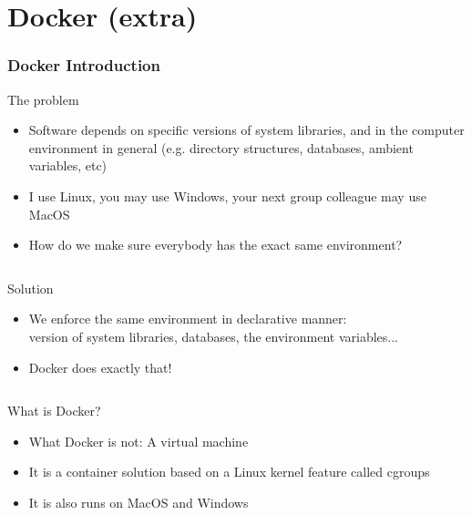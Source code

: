 \documentclass[fleqn,aspectratio=169,10pt]{beamer}
\begin{document}
\section{Docker (extra)}
\begin{frame}
  \frametitle{Docker Introduction}
  \vspace*{-1.5ex}
  \pause
  \begin{block}{The problem}
    \begin{itemize}
      \item Software depends on specific versions of system libraries, and in the computer environment in general (e.g. directory structures, databases, ambient variables, etc)
            \pause
      \item I use Linux, you may use Windows, your next group colleague may use MacOS
            \pause
      \item How do we make sure everybody has the exact same environment?
    \end{itemize}
    \pause
  \vspace*{-2ex}
    \begin{columns}
      \begin{column}{.95\textwidth}
        \begin{block}{Solution}
          \begin{itemize}
            \item We enforce the same environment in declarative manner: \\ version of system libraries, databases, the environment variables...
            \item Docker does exactly that!
          \end{itemize}
        \end{block}
      \end{column}
    \end{columns}
  \end{block}
  \vspace*{-1.8ex}
  \pause
  \begin{columns}
    \begin{column}{.45\textwidth}
  \begin{block}{What is Docker?}
    \begin{itemize}
            \pause
      \item What Docker is not: A virtual machine
            \pause
      \item It is a container solution based on a Linux kernel feature called cgroups
      \item It is also runs on MacOS and Windows

\end{itemize}
\end{block}
\end{column}
\end{columns}
\end{frame}
\end{document}

